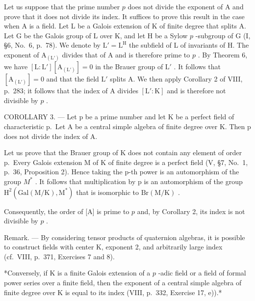 Let us suppose that the prime number \(p\) does not divide the exponent of A and prove that it does not divide its index. It suffices to prove this result in the case when A is a field. Let L be a Galois extension of K of finite degree that splits A. Let G be the Galois group of L over K, and let H be a Sylow \(p\) -subgroup of G (I, §6, No.~6, p.~78). We denote by \(\mathrm{L}' = \mathrm{L}^{\mathrm{H}}\) the subfield of L of invariants of H. The exponent of \(\mathrm{A}_{(\mathrm{L}')}\) divides that of A and is therefore prime to \(p\) . By Theorem 6, we have \([\mathrm{L}:\mathrm{L}'][\mathrm{A}_{(\mathrm{L}')}] = 0\) in the Brauer group of \(\mathrm{L}'\) . It follows that \([\mathrm{A}_{(\mathrm{L}')}] = 0\) and that the field \(\mathrm{L}'\) splits A. We then apply Corollary 2 of VIII, p.~283; it follows that the index of A divides \([\mathrm{L}':\mathrm{K}]\) and is therefore not divisible by \(p\) .

COROLLARY 3. --- Let p be a prime number and let K be a perfect field of characteristic p.~Let A be a central simple algebra of finite degree over K. Then p does not divide the index of A.

Let us prove that the Brauer group of K does not contain any element of order p.~Every Galois extension M of K of finite degree is a perfect field (V, §7, No.~1, p.~36, Proposition 2). Hence taking the p-th power is an automorphism of the group \(M^{*}\) . It follows that multiplication by p is an automorphism of the group \(\mathrm{H}^{2}(\mathrm{Gal}(\mathrm{M}/\mathrm{K}),\mathrm{M}^{*})\) that is isomorphic to \(\mathrm{Br}(\mathrm{M}/\mathrm{K})\) .

Consequently, the order of {[}A{]} is prime to \(p\) and, by Corollary 2, its index is not divisible by \(p\) .

Remark. --- By considering tensor products of quaternion algebras, it is possible to construct fields with center K, exponent 2, and arbitrarily large index (cf.~VIII, p.~371, Exercises 7 and 8).

*Conversely, if K is a finite Galois extension of a \(p\) -adic field or a field of formal power series over a finite field, then the exponent of a central simple algebra of finite degree over K is equal to its index (VIII, p.~332, Exercise 17, e)).*

